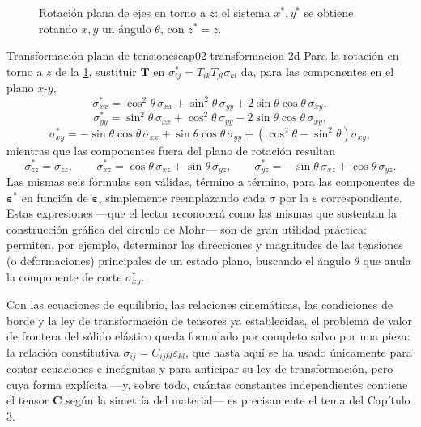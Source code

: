 \begin{figure}[htbp]
\centering
{}
\caption{Rotación plana de ejes en torno a $z$: el sistema $x^{*},y^{*}$ se obtiene rotando $x,y$ un ángulo $\theta$, con $z^{*}=z$.}
\label{fig:cap02-rotacion-ejes}
\end{figure}

\begin{ejemplo}{Transformación plana de tensiones}{cap02-transformacion-2d}
Para la rotación en torno a $z$ de la \cref{fig:cap02-rotacion-ejes}, sustituir $\bm T$ en $\sigma^{*}_{ij}=T_{ik}T_{jl}\sigma_{kl}$ da, para las componentes en el plano $x$-$y$,
\[
\sigma^{*}_{xx} = \cos^2\theta\,\sigma_{xx} + \sin^2\theta\,\sigma_{yy} + 2\sin\theta\cos\theta\,\sigma_{xy},
\]
\[
\sigma^{*}_{yy} = \sin^2\theta\,\sigma_{xx} + \cos^2\theta\,\sigma_{yy} - 2\sin\theta\cos\theta\,\sigma_{xy},
\]
\[
\sigma^{*}_{xy} = -\sin\theta\cos\theta\,\sigma_{xx} + \sin\theta\cos\theta\,\sigma_{yy} + \left(\cos^2\theta - \sin^2\theta\right)\sigma_{xy},
\]
mientras que las componentes fuera del plano de rotación resultan
\[
\sigma^{*}_{zz} = \sigma_{zz}, \qquad
\sigma^{*}_{xz} = \cos\theta\,\sigma_{xz} + \sin\theta\,\sigma_{yz}, \qquad
\sigma^{*}_{yz} = -\sin\theta\,\sigma_{xz} + \cos\theta\,\sigma_{yz}.
\]
Las mismas seis fórmulas son válidas, término a término, para las componentes de $\bm\varepsilon^{*}$ en función de $\bm\varepsilon$, simplemente reemplazando cada $\sigma$ por la $\varepsilon$ correspondiente. Estas expresiones —que el lector reconocerá como las mismas que sustentan la construcción gráfica del círculo de Mohr— son de gran utilidad práctica: permiten, por ejemplo, determinar las direcciones y magnitudes de las tensiones (o deformaciones) principales de un estado plano, buscando el ángulo $\theta$ que anula la componente de corte $\sigma^{*}_{xy}$.
\end{ejemplo}

Con las ecuaciones de equilibrio, las relaciones cinemáticas, las condiciones de borde y la ley de transformación de tensores ya establecidas, el problema de valor de frontera del sólido elástico queda formulado por completo salvo por una pieza: la relación constitutiva $\sigma_{ij}=C_{ijkl}\varepsilon_{kl}$, que hasta aquí se ha usado únicamente para contar ecuaciones e incógnitas y para anticipar su ley de transformación, pero cuya forma explícita —y, sobre todo, cuántas constantes independientes contiene el tensor $\bm C$ según la simetría del material— es precisamente el tema del Capítulo 3.
